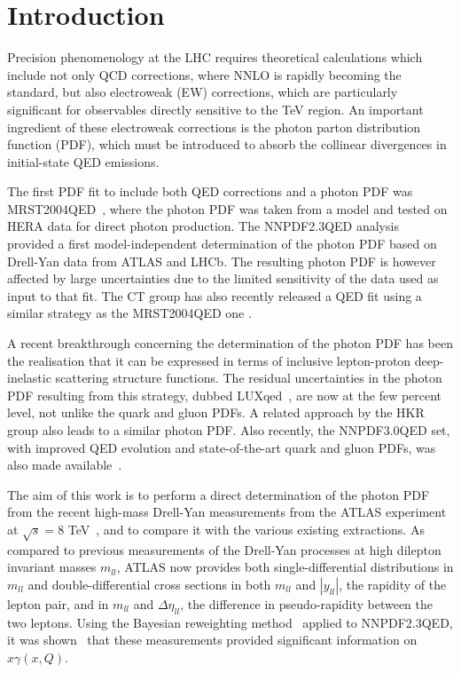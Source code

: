 \section{Introduction}

Precision phenomenology at the LHC requires theoretical calculations
which include not only QCD corrections, where NNLO is rapidly becoming
the standard, but also electroweak (EW) corrections, which are
particularly significant for observables directly sensitive to the TeV
region.
%
An important ingredient of these electroweak corrections is the photon
parton distribution function (PDF), which must be introduced to absorb
the collinear divergences in initial-state QED emissions.

The first PDF fit to include both QED corrections and a photon PDF was
MRST2004QED~\cite{Martin:2004dh}, where the photon PDF was taken from
a model and tested on HERA data for direct photon production.
%
The NNPDF2.3QED analysis~\cite{Ball:2013hta} provided a
first model-independent determination of the photon PDF based on
Drell-Yan data from ATLAS and LHCb.
%
The resulting photon PDF is however affected by large uncertainties
due to the limited sensitivity of the data used as input to that fit.
%
The CT group has also recently released a QED fit using a similar
strategy as the MRST2004QED one \cite{Schmidt:2014aba}.

A recent breakthrough concerning the determination of the photon PDF
has been the realisation that it can be expressed in terms of
inclusive lepton-proton deep-inelastic scattering structure functions.
%
The residual uncertainties in the photon PDF resulting from this
strategy, dubbed LUXqed~\cite{Manohar:2016nzj}, are now at the few
percent level, not unlike the quark and gluon PDFs.
%
A related approach by the HKR~\cite{Harland-Lang:2016apc}
group also leads to a similar photon PDF.
%
Also recently, the NNPDF3.0QED set, with improved
QED evolution and state-of-the-art quark and gluon
PDFs, was also made available~\cite{Bertone:2016ume,Ball:2014uwa}.

The aim of this work is to perform a direct determination of the
photon PDF from the recent high-mass Drell-Yan measurements from the
ATLAS experiment at $\sqrt{s}=8$ TeV~\cite{Aad:2016zzw}, and to
compare it with the various existing extractions.
%
As compared to previous measurements of the Drell-Yan processes at
high dilepton invariant masses $m_{ll}$, ATLAS now provides both
single-differential distributions in $m_{ll}$ and double-differential
cross sections in both $m_{ll}$ and $|y_{ll}|$, the rapidity of the
lepton pair, and in $m_{ll}$ and $\Delta\eta_{ll}$, the difference in
pseudo-rapidity between the two leptons.
%
Using the Bayesian reweighting method~\cite{Ball:2011gg,Ball:2010gb}
applied to NNPDF2.3QED, it was shown~\cite{Aad:2016zzw} that these
measurements provided significant information on $x\gamma(x,Q)$.

